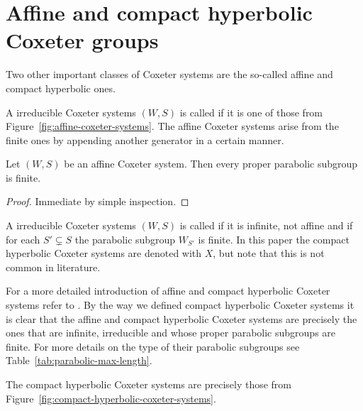 \section{Affine and compact hyperbolic Coxeter groups}
\label{sec:coxeter-groups-affine-compact-hyperbolic}

Two other important classes of Coxeter systems are the so-called affine and compact hyperbolic ones.

\begin{defi}
	A irreducible Coxeter systems $(W,S)$ is called  if it is one of those from Figure~\ref{fig:affine-coxeter-systems}. The affine Coxeter systems arise from the finite ones by appending another generator in a certain manner.
\end{defi}

\begin{prop}
	Let $(W,S)$ be an affine Coxeter system. Then every proper parabolic subgroup is finite.

	\begin{proof}
		Immediate by simple inspection.
	\end{proof}
\end{prop}

\begin{defi}
	A irreducible Coxeter systems $(W,S)$ is called  if it is infinite, not affine and if for each $S' \subsetneq S$ the parabolic subgroup $W_{S'}$ is finite. In this paper the compact hyperbolic Coxeter systems are denoted with $X$, but note that this is not common in literature.
\end{defi}

For a more detailed introduction of affine and compact hyperbolic Coxeter systems refer to \cite[Section 2.5, 6.7 -- 6.9]{humphreys:coxeter}. By the way we defined compact hyperbolic Coxeter systems it is clear that the affine and compact hyperbolic Coxeter systems are precisely the ones that are infinite, irreducible and whose proper parabolic subgroups are finite. For more details on the type of their parabolic subgroups see Table~\ref{tab:parabolic-max-length}.

\begin{lemm}
	The compact hyperbolic Coxeter systems are precisely those from Figure~\ref{fig:compact-hyperbolic-coxeter-systems}.
\end{lemm}

